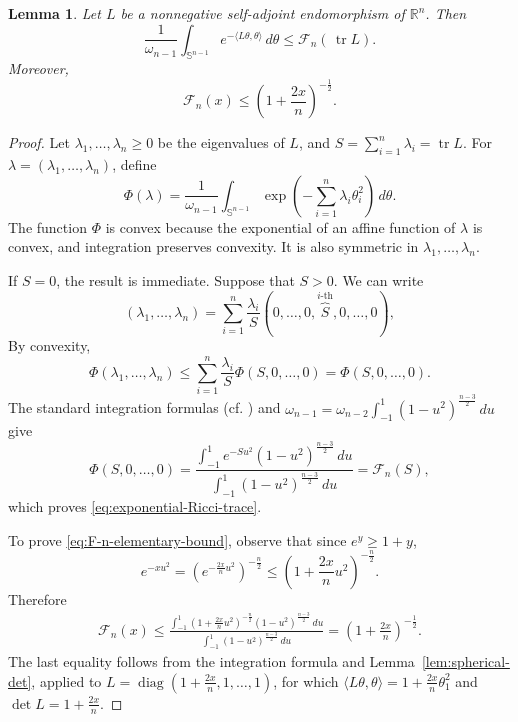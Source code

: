 \documentclass[11pt, reqno]{amsart}
\newtheorem{lemma}{Lemma}
\begin{document}
\begin{lemma}\label{lem:exponential-Ricci-trace}
Let $L$ be a nonnegative self-adjoint endomorphism of $\mathbb R^n$. Then
\begin{equation}\label{eq:exponential-Ricci-trace}
\frac{1}{\omega_{n-1}}
\int_{\mathbb S^{n-1}}
e^{- \langle L\theta, \theta\rangle}\, d\theta
\le
\mathcal F_n\left(\, \operatorname{tr}L\right).
\end{equation}
Moreover,
\begin{equation}\label{eq:F-n-elementary-bound}
\mathcal F_n(x)
\le
\left(1+\frac{2x}{n}\right)^{-\frac12}.
\end{equation}
\end{lemma}

\begin{proof}
Let $\lambda_1, \ldots, \lambda_n\ge 0$ be the eigenvalues of $L$, and
$S=\sum_{i=1}^n\lambda_i=\operatorname{tr}L$.
For $\lambda=(\lambda_1, \ldots, \lambda_n)$, define
$$
\Phi(\lambda)
=
\frac{1}{\omega_{n-1}}
\int_{\mathbb S^{n-1}}
\exp\left(- \sum_{i=1}^n\lambda_i\theta_i^2\right)\, d\theta.
$$
The function $\Phi$ is convex because the exponential of an affine function
of $\lambda$ is convex, and integration preserves convexity. It is also
symmetric in $\lambda_1, \ldots, \lambda_n$.

If $S=0$, the result is immediate. Suppose that $S>0$.
We can write
$$
(\lambda_1, \ldots, \lambda_n)
=
\sum_{i=1}^n\frac{\lambda_i}{S}
(0, \ldots, 0, \overbrace{S}^{\textrm{$i$-th}}, 0, \ldots, 0),
$$
By convexity,
$$
\Phi(\lambda_1, \ldots, \lambda_n)
\le
\sum_{i=1}^n\frac{\lambda_i}{S}\Phi(S, 0, \ldots, 0)
=
\Phi(S, 0, \ldots, 0).
$$
The standard integration formulas (cf. \cite[Equation~(1.16)]{AtkinsonHan}) and $\omega_{n-1}=\omega_{n-2}\int_{-1}^1
(1-u^2)^{\frac{n-3}{2}}\, du$ give
$$
\Phi(S, 0, \ldots, 0)
=
\frac{
\displaystyle
\int_{-1}^1
e^{- Su^2}(1-u^2)^{\frac{n-3}{2}}\, du
}{
\displaystyle
\int_{-1}^1
(1-u^2)^{\frac{n-3}{2}}\, du
}
=
\mathcal F_n(S),
$$
which proves \eqref{eq:exponential-Ricci-trace}.

To prove \eqref{eq:F-n-elementary-bound}, observe that since $e^y\ge 1+y$,
$$
e^{-xu^2}=
\left(e^{-\frac{2x}{n }u^2}\right)^{-\frac{n}{2}}
\le \left(1+\frac{2x}{n}u^2\right)^{-\frac n2}.
$$
Therefore
\begin{align*}
\mathcal F_n(x)
\le \frac{ \displaystyle \int_{-1}^1 \left(1+\frac{2x}{n}u^2\right)^{-\frac n2} (1-u^2)^{\frac{n-3}{2}}\, du }{ \displaystyle \int_{-1}^1 (1-u^2)^{\frac{n-3}{2}}\, du }
=\left(1+\frac{2x}{n}\right)^{-\frac12}.
\end{align*}
The last equality follows from the integration formula \cite[Equation~(1.16)]{AtkinsonHan} and
Lemma~\ref{lem:spherical-det}, applied to $L=\operatorname{diag}\left(1+\frac{2x}{n}, 1, \ldots, 1\right)$, for which $\langle L\theta, \theta\rangle=1+\frac{2x}{n}\theta_1^2$ and $\det L=1+\frac{2x}{n}$.
\end{proof}
\end{document}
